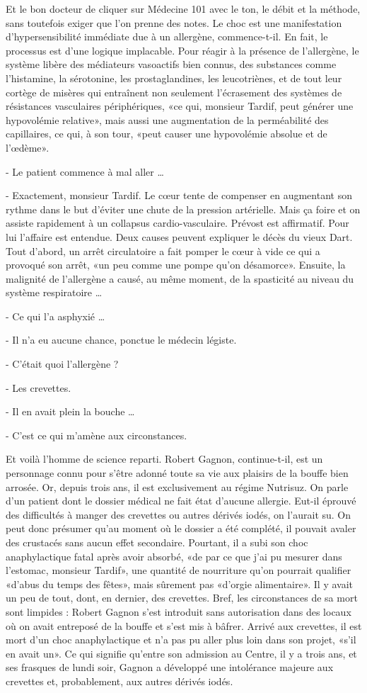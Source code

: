 Et le bon docteur de cliquer sur Médecine 101 avec le ton, le débit et la méthode, sans toutefois exiger que l’on prenne des notes. Le choc est une manifestation d’hypersensibilité immédiate due à un allergène, commence-t-il. En fait, le processus est d’une logique implacable. Pour réagir à la présence de l’allergène, le système libère des médiateurs vasoactifs bien connus, des substances comme l’histamine, la sérotonine, les prostaglandines, les leucotriènes, et de tout leur cortège de misères qui entraînent non seulement l’écrasement des systèmes de résistances vasculaires périphériques, «ce qui, monsieur Tardif, peut générer une hypovolémie relative», mais aussi une augmentation de la perméabilité des capillaires, ce qui, à son tour, «peut causer une hypovolémie absolue et de l’œdème».

- Le patient commence à mal aller …

- Exactement, monsieur Tardif. Le cœur tente de compenser en augmentant son rythme dans le but d’éviter une chute de la pression artérielle. Mais ça foire et on assiste rapidement à un collapsus cardio-vasculaire.
Prévost est affirmatif. Pour lui l’affaire est entendue. Deux causes peuvent expliquer le décès du vieux Dart. Tout d’abord, un arrêt circulatoire a fait pomper le cœur à vide ce qui a provoqué son arrêt, «un peu comme une pompe qu’on désamorce». Ensuite, la malignité de l’allergène a causé, au même moment, de la spasticité au niveau du système respiratoire …

- Ce qui l’a asphyxié …

- Il n’a eu aucune chance, ponctue le médecin légiste.

- C’était quoi l’allergène ?

- Les crevettes.

- Il en avait plein la bouche …

- C’est ce qui m’amène aux circonstances.

Et voilà l’homme de science reparti. Robert Gagnon, continue-t-il, est un personnage connu pour s’être adonné toute sa vie aux plaisirs de la bouffe bien arrosée. Or, depuis trois ans, il est exclusivement au régime Nutrisuz. On parle d’un patient dont le dossier médical ne fait état d’aucune allergie. Eut-il éprouvé des difficultés à manger des crevettes ou autres dérivés iodés, on l’aurait su. On peut donc présumer qu’au moment où le dossier a été complété, il pouvait avaler des crustacés sans aucun effet secondaire. Pourtant, il a subi son choc anaphylactique fatal après avoir absorbé, «de par ce que j’ai pu mesurer dans l’estomac, monsieur Tardif», une quantité de nourriture qu’on pourrait qualifier «d’abus du temps des fêtes», mais sûrement pas «d’orgie alimentaire». Il y avait un peu de tout, dont, en dernier, des crevettes. Bref, les circonstances de sa mort sont limpides : Robert Gagnon s’est introduit sans autorisation dans des locaux où on avait entreposé de la bouffe et s’est mis à bâfrer. Arrivé aux crevettes, il est mort d’un choc anaphylactique et n’a pas pu aller plus loin dans son projet, «s’il en avait un». Ce qui signifie qu’entre son admission au Centre, il y a trois ans, et ses frasques de lundi soir, Gagnon a développé une intolérance majeure aux crevettes et, probablement, aux autres dérivés iodés.

